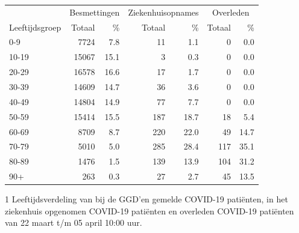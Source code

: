 \documentclass[
  english,
  man,floatsintext]{apa6}
\begin{document}
\begin{table}
\centering\begingroup\fontsize{11}{13}\selectfont

\begin{threeparttable}
\begin{tabular}{lrrrrrr}
\toprule
\multicolumn{1}{c}{ } & \multicolumn{2}{c}{Besmettingen} & \multicolumn{2}{c}{Ziekenhuisopnames} & \multicolumn{2}{c}{Overleden} \\
\cmidrule(l{3pt}r{3pt}){2-3} \cmidrule(l{3pt}r{3pt}){4-5} \cmidrule(l{3pt}r{3pt}){6-7}
Leeftijdsgroep & Totaal & \% & Totaal & \% & Totaal & \%\\
\midrule
0-9 & 7724 & 7.8 & 11 & 1.1 & 0 & 0.0\\
10-19 & 15067 & 15.1 & 3 & 0.3 & 0 & 0.0\\
20-29 & 16578 & 16.6 & 17 & 1.7 & 0 & 0.0\\
30-39 & 14609 & 14.7 & 36 & 3.6 & 0 & 0.0\\
40-49 & 14804 & 14.9 & 77 & 7.7 & 0 & 0.0\\
50-59 & 15414 & 15.5 & 187 & 18.7 & 18 & 5.4\\
60-69 & 8709 & 8.7 & 220 & 22.0 & 49 & 14.7\\
70-79 & 5010 & 5.0 & 285 & 28.4 & 117 & 35.1\\
80-89 & 1476 & 1.5 & 139 & 13.9 & 104 & 31.2\\
90+ & 263 & 0.3 & 27 & 2.7 & 45 & 13.5\\
\bottomrule
\end{tabular}
\begin{tablenotes}
\item[1] Leeftijdsverdeling van bij de GGD’en gemelde COVID-19 patiënten, in het ziekenhuis opgenomen COVID-19 patiënten en overleden COVID-19 patiënten van 22 maart t/m 05 april 10:00 uur.
\end{tablenotes}
\end{threeparttable}
\endgroup{}
\end{table}

\newpage
\end{document}
